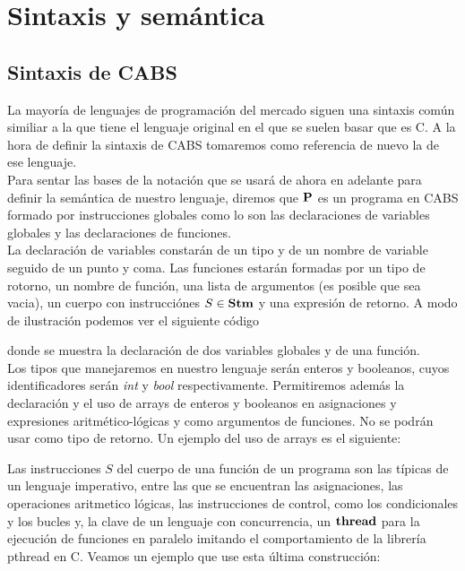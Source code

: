 \chapter{Sintaxis y semántica}
\section{Sintaxis de CABS}
La mayoría de lenguajes de programación del mercado siguen una sintaxis común similiar a la que tiene el lenguaje original en el que se suelen basar que es C. A la hora de definir la sintaxis de CABS tomaremos como referencia de nuevo la de ese lenguaje.\\

Para sentar las bases de la notación que se usará de ahora en adelante para definir la semántica de nuestro lenguaje, diremos que $\P$ es un programa en CABS formado por instrucciones globales como lo son las declaraciones de variables globales y las declaraciones de funciones.\\

La declaración de variables constarán de un tipo y de un nombre de variable seguido de un punto y coma. Las funciones estarán formadas por un tipo de rotorno, un nombre de función, una lista de argumentos (es posible que sea vacia), un cuerpo con instrucciónes $S \in \Stm$ y una expresión de retorno. A modo de ilustración podemos ver el siguiente código



donde se muestra la declaración de dos variables globales y de una función.\\

Los tipos que manejaremos en nuestro lenguaje serán enteros y booleanos, cuyos identificadores serán \emph{int} y \emph{bool} respectivamente. Permitiremos además la declaración y el uso de arrays de enteros y booleanos en asignaciones y expresiones aritmético-lógicas y como argumentos de funciones. No se podrán usar como tipo de retorno. Un ejemplo del uso de arrays es el siguiente:



Las instrucciones $S$ del cuerpo de una función de un programa son las típicas de un lenguaje imperativo, entre las que se encuentran las asignaciones, las operaciones aritmetico lógicas, las instrucciones de control, como los condicionales y los bucles y, la clave de un lenguaje con concurrencia, un $\thread$ para la ejecución de funciones en paralelo imitando el comportamiento de la librería pthread en C. Veamos un ejemplo que use esta última construcción:

